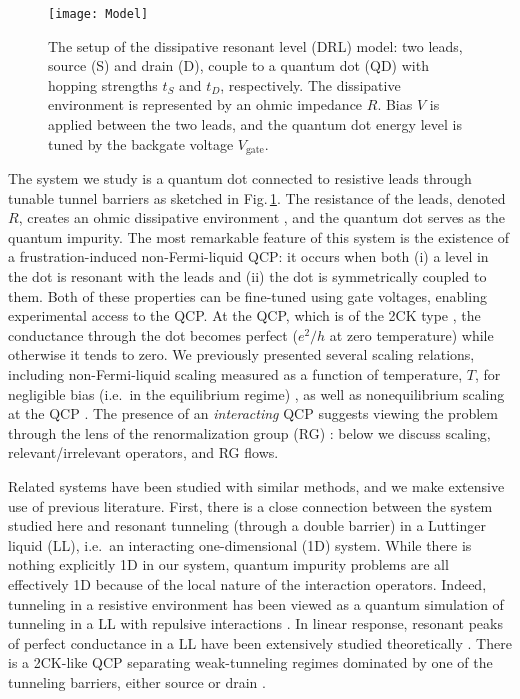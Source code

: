 \documentclass[aps,prb,reprint,floatfix,superscriptaddress,amssymb,amsmath]{revtex4-2}
\begin{document}
\begin{figure}[t]
\texttt{[image: Model]} 
\caption{The setup of the dissipative resonant level (DRL) model: two leads, source (S) and drain (D), couple to a quantum dot (QD) with hopping strengths $t_S$ and $t_D$, respectively. The dissipative environment is represented by an ohmic impedance $R$. Bias $V$ is applied between the two leads, and the quantum dot energy level is tuned by the backgate voltage $V_{\text{gate}}$. 
}
\label{fig:model} 
\end{figure}


The system we study is a quantum dot connected to resistive leads through tunable tunnel barriers as sketched in Fig.\,\ref{fig:model}. 
The resistance of the leads, denoted $R$, creates an ohmic dissipative environment \cite{Bomze09,Mebrahtu12}, and the quantum dot serves as the quantum impurity.  The most remarkable feature of this system is the existence of a frustration-induced non-Fermi-liquid QCP: it occurs when both (i) a level in the dot is resonant with the leads and (ii) the dot is symmetrically coupled to them. 
Both of these properties can be fine-tuned using gate voltages, enabling experimental access to the QCP.  At the QCP, which is of the 2CK type \cite{Mebrahtu12}, the conductance through the dot becomes perfect ($e^2/h$ at zero temperature) while otherwise it tends to zero. We previously presented several scaling relations, including non-Fermi-liquid scaling  
measured as a function of temperature, $T$, for negligible bias (i.e.\ in the equilibrium regime) \cite{Mebrahtu12,Mebrahtu13}, as well as nonequilibrium scaling at the QCP \cite{ZhangNoneqPRR21}. 
The presence of an \emph{interacting} QCP suggests viewing the problem through the lens of the renormalization group (RG)  \cite{FisherRGRMP98}: below we discuss scaling, relevant/irrelevant operators, and RG flows. 

Related systems have been studied with similar methods, and we make extensive use of previous literature. First, there is a close connection between the system studied here and resonant tunneling (through a double barrier) in a Luttinger liquid (LL), i.e.\ an interacting one-dimensional (1D) system.  While there is nothing explicitly 1D in our system, quantum impurity problems are all effectively 1D because of the local 
nature of the interaction operators. Indeed, tunneling in a resistive environment has been viewed as a quantum simulation of tunneling in a LL with repulsive interactions 
\cite{MatveevGlazman93,FlensbergPRB93,SassettiWeissEPL94,SafiSaleurPRL04,LeHurLiPRB05, BordaPRB05,*BordaZarandX06, FlorensPRB07,  Mebrahtu12, Mebrahtu13, JezouinPierre13, AnthorePierrePRX18, LeHurDrivenQImpReviewCRP18}.
In linear response, resonant peaks of perfect conductance in a LL have been extensively studied theoretically   \cite{KaneFisherPRB92,*KaneFisherPRB92a,EggertAffleck92,Furusaki93,*Furusaki98,YiKanePRB98,*YiPRB02,NazarovGlazman03,polyakov03,KomnikGogolinPRL03,Meden2005,GoldsteinPRL10a,HuKaneX16}. There is a 2CK-like QCP separating weak-tunneling regimes dominated by one of the tunneling barriers, either source or drain \cite{EggertAffleck92,YiKanePRB98,KomnikGogolinPRL03}. 
\end{document}
